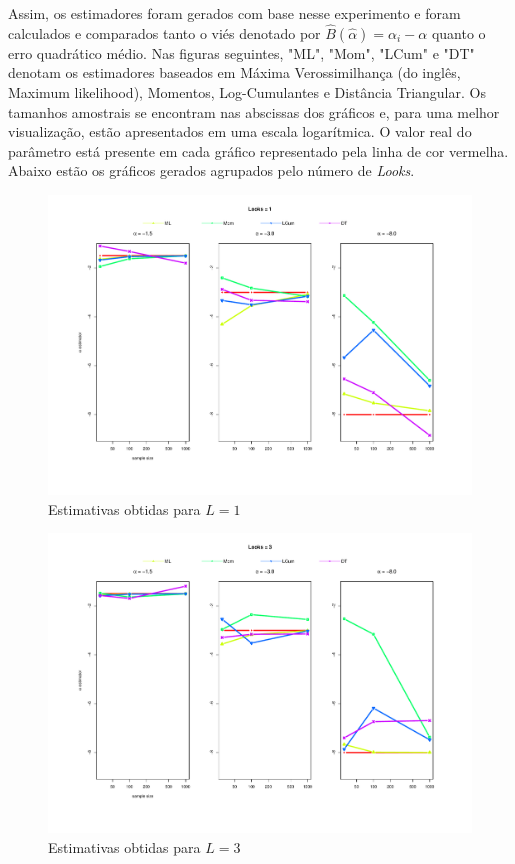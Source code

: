 \documentclass[12pt]{article}
\begin{document}
Assim, os estimadores foram gerados com base nesse experimento e foram calculados e comparados tanto o viés denotado por $\hat{B}(\hat{\alpha}) = \alpha_i - \alpha$ quanto o erro quadrático médio. Nas figuras seguintes, "ML", "Mom", "LCum" e "DT" denotam os estimadores baseados em Máxima Verossimilhança (do inglês, Maximum likelihood), Momentos, Log-Cumulantes e Distância Triangular. Os tamanhos amostrais se encontram nas abscissas dos gráficos e, para uma melhor visualização, estão apresentados em uma escala logarítmica. O valor real do parâmetro está presente em cada gráfico representado pela linha de cor vermelha. Abaixo estão os gráficos gerados agrupados pelo número de \textit{Looks}.
\begin{figure}[H]
     \centering
     \includegraphics[scale=0.5]{plots/estimators_L=1.pdf}
     \caption{Estimativas obtidas para $L=1$}
     \label{graf_8}
\end{figure}
\begin{figure}[H]
     \centering
     \includegraphics[scale=0.5]{plots/estimators_L=3.pdf}
     \caption{Estimativas obtidas para $L=3$}
     \label{graf_9}
\end{figure}
\end{document}
